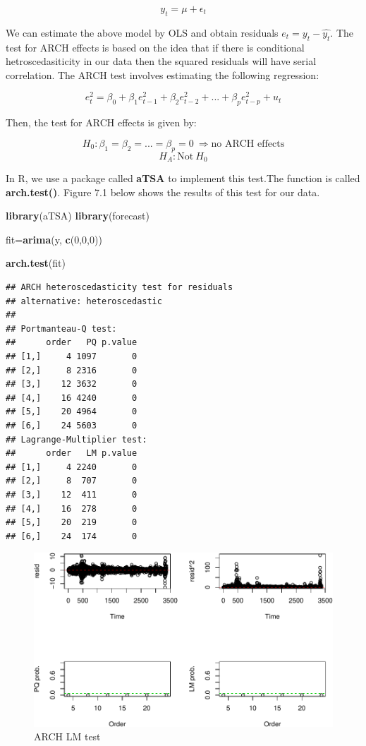 \documentclass[]{book}
\newenvironment{Shaded}{\begin{snugshade}}{\end{snugshade}}
\newcommand{\KeywordTok}[1]{\textcolor[rgb]{0.13,0.29,0.53}{\textbf{#1}}}
\newcommand{\DecValTok}[1]{\textcolor[rgb]{0.00,0.00,0.81}{#1}}
\newcommand{\NormalTok}[1]{#1}
\theoremstyle{definition}
\theoremstyle{definition}
\theoremstyle{definition}
\theoremstyle{remark}
\begin{document}
\[y_t=\mu +\epsilon_t\]

We can estimate the above model by OLS and obtain residuals \(e_t=y_t-\hat{y_t}\). The test for ARCH effects is based on the idea that if there is conditional hetroscedasiticity in our data then the squared residuals will have serial correlation. The ARCH test involves estimating the following regression:

\[e^2_t= \beta_0 +\beta_1 e^2_{t-1} + \beta_2 e^2_{t-2}+...+ \beta_p e^2_{t-p} + u_t\]

Then, the test for ARCH effects is given by:

\[H_0: \beta_1=\beta_2=...=\beta_p=0 \ \Rightarrow \text{no ARCH effects}\]
\[ H_A: \text{Not} \ H_0\]

In R, we use a package called \textbf{aTSA} to implement this test.The function is called \textbf{arch.test()}. Figure 7.1 below shows the results of this test for our data.

\begin{Shaded}
\begin{Highlighting}[]
\KeywordTok{library}\NormalTok{(aTSA)}
\KeywordTok{library}\NormalTok{(forecast)}

\NormalTok{fit=}\KeywordTok{arima}\NormalTok{(y, }\KeywordTok{c}\NormalTok{(}\DecValTok{0}\NormalTok{,}\DecValTok{0}\NormalTok{,}\DecValTok{0}\NormalTok{))}

\KeywordTok{arch.test}\NormalTok{(fit)}
\end{Highlighting}
\end{Shaded}

\begin{verbatim}
## ARCH heteroscedasticity test for residuals 
## alternative: heteroscedastic 
## 
## Portmanteau-Q test: 
##      order   PQ p.value
## [1,]     4 1097       0
## [2,]     8 2316       0
## [3,]    12 3632       0
## [4,]    16 4240       0
## [5,]    20 4964       0
## [6,]    24 5603       0
## Lagrange-Multiplier test: 
##      order   LM p.value
## [1,]     4 2240       0
## [2,]     8  707       0
## [3,]    12  411       0
## [4,]    16  278       0
## [5,]    20  219       0
## [6,]    24  174       0
\end{verbatim}

\begin{figure}
\centering
\includegraphics{bookdown-demo_files/figure-latex/table1-1.pdf}
\caption{\label{fig:table1}ARCH LM test}
\end{figure}
\end{document}
